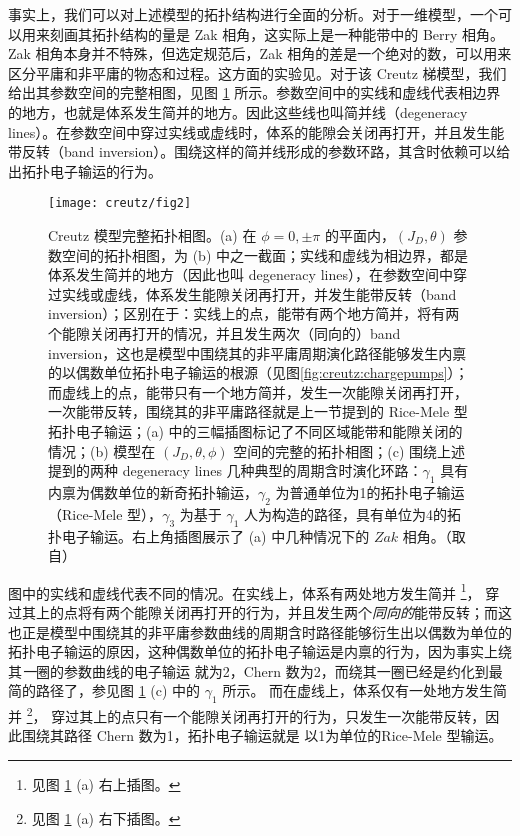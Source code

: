 事实上，我们可以对上述模型的拓扑结构进行全面的分析。对于一维模型，一个可以用来刻画其拓扑结构的量是 Zak 相角\cite{zak1989}，这实际上是一种能带中的 Berry 相角。Zak 相角本身并不特殊，但选定规范后，Zak 相角的差是一个绝对的数，可以用来区分平庸和非平庸的物态和过程。这方面的实验见。对于该 Creutz 梯模型，我们给出其参数空间的完整相图，见图 \ref{fig:creutz:topophase} 所示。参数空间中的实线和虚线代表相边界的地方，也就是体系发生简并的地方。因此这些线也叫简并线（degeneracy lines）。在参数空间中穿过实线或虚线时，体系的能隙会关闭再打开，并且发生能带反转（band inversion）\cite{topobook}。围绕这样的简并线形成的参数环路，其含时依赖可以给出拓扑电子输运的行为。
\begin{figure}[!htb]
\centering
\texttt{[image: creutz/fig2]}
\caption{Creutz 模型完整拓扑相图。(a) 在 $\phi=0,\pm\pi$ 的平面内，$(J_D, \theta)$ 参数空间的拓扑相图，为 (b) 中之一截面；实线和虚线为相边界，都是体系发生简并的地方（因此也叫 degeneracy lines），在参数空间中穿过实线或虚线，体系发生能隙关闭再打开，并发生能带反转（band inversion）；区别在于：实线上的点，能带有两个地方简并，将有两个能隙关闭再打开的情况，并且发生两次（同向的）band inversion，这也是模型中围绕其的非平庸周期演化路径能够发生内禀的以偶数单位拓扑电子输运的根源（见图\ref{fig:creutz:chargepumps}）；而虚线上的点，能带只有一个地方简并，发生一次能隙关闭再打开，一次能带反转，围绕其的非平庸路径就是上一节提到的 Rice-Mele 型拓扑电子输运；(a) 中的三幅插图标记了不同区域能带和能隙关闭的情况；(b) 模型在 $(J_D, \theta, \phi)$ 空间的完整的拓扑相图；(c) 围绕上述提到的两种 degeneracy lines 几种典型的周期含时演化环路：$\gamma_1$ 具有内禀为偶数单位的新奇拓扑输运，$\gamma_2$ 为普通单位为1的拓扑电子输运（Rice-Mele 型），$\gamma_3$ 为基于 $\gamma_1$ 人为构造的路径，具有单位为4的拓扑电子输运。右上角插图展示了 (a) 中几种情况下的 $Zak$ 相角\cite{creutz}。（取自）}
\label{fig:creutz:topophase}
\end{figure}

图中的实线和虚线代表不同的情况。在实线上，体系有两处地方发生简并
\footnote{见图 \ref{fig:creutz:topophase} (a) 右上插图。}，
穿过其上的点将有两个能隙关闭再打开的行为，并且发生两个\textit{同向的}能带反转；而这也正是模型中围绕其的非平庸参数曲线的周期含时路径能够衍生出以偶数为单位的拓扑电子输运的原因，这种偶数单位的拓扑电子输运是内禀的行为，因为事实上绕其\textit{一}圈的参数曲线的电子输运 就为2，Chern 数为2，而绕其一圈已经是约化到最简的路径了，参见图 \ref{fig:creutz:topophase} (c) 中的 $\gamma_1$ 所示。
而在虚线上，体系仅有一处地方发生简并
\footnote{见图 \ref{fig:creutz:topophase} (a) 右下插图。}，
穿过其上的点只有一个能隙关闭再打开的行为，只发生一次能带反转，因此围绕其路径 Chern 数为1，拓扑电子输运就是 以1为单位的Rice-Mele 型输运。

